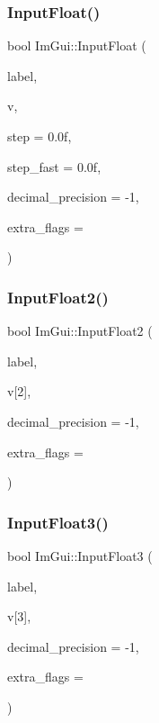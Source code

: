 \hypertarget{namespace_im_gui_a94e4bba578bb1ab757a85c86d4a659d8}{}\label{namespace_im_gui_a94e4bba578bb1ab757a85c86d4a659d8} 
\subsubsection{\texorpdfstring{Input\+Float()}{InputFloat()}}
{\footnotesize\ttfamily bool Im\+Gui\+::\+Input\+Float (\begin{DoxyParamCaption}\item[{const char $\ast$}]{label,  }\item[{float $\ast$}]{v,  }\item[{float}]{step = {\ttfamily 0.0f},  }\item[{float}]{step\+\_\+fast = {\ttfamily 0.0f},  }\item[{int}]{decimal\+\_\+precision = {\ttfamily -\/1},  }\item[{Im\+Gui\+Input\+Text\+Flags}]{extra\+\_\+flags = {} }\end{DoxyParamCaption})}

\hypertarget{namespace_im_gui_a0c7aea6408696de9696f38a2f32419c4}{}\label{namespace_im_gui_a0c7aea6408696de9696f38a2f32419c4} 
\subsubsection{\texorpdfstring{Input\+Float2()}{InputFloat2()}}
{\footnotesize\ttfamily bool Im\+Gui\+::\+Input\+Float2 (\begin{DoxyParamCaption}\item[{const char $\ast$}]{label,  }\item[{float}]{v\mbox{[}2\mbox{]},  }\item[{int}]{decimal\+\_\+precision = {\ttfamily -\/1},  }\item[{Im\+Gui\+Input\+Text\+Flags}]{extra\+\_\+flags = {} }\end{DoxyParamCaption})}

\hypertarget{namespace_im_gui_a77e8d23f2e0477d11a7eb6b0aa773eb9}{}\label{namespace_im_gui_a77e8d23f2e0477d11a7eb6b0aa773eb9} 
\subsubsection{\texorpdfstring{Input\+Float3()}{InputFloat3()}}
{\footnotesize\ttfamily bool Im\+Gui\+::\+Input\+Float3 (\begin{DoxyParamCaption}\item[{const char $\ast$}]{label,  }\item[{float}]{v\mbox{[}3\mbox{]},  }\item[{int}]{decimal\+\_\+precision = {\ttfamily -\/1},  }\item[{Im\+Gui\+Input\+Text\+Flags}]{extra\+\_\+flags = {} }\end{DoxyParamCaption})}

